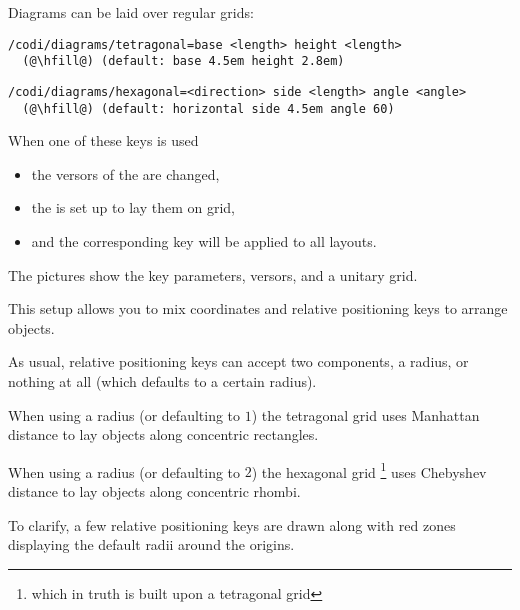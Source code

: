 \begin{marginfigure}[0cm]
\begin{subfigure}{\linewidth}
    \bigskip
  \end{subfigure}
\end{marginfigure}

Diagrams can be laid over regular grids:

\begin{lstlisting}
/codi/diagrams/tetragonal=base <length> height <length>
  (@\hfill@) (default: base 4.5em height 2.8em)
\end{lstlisting}

\begin{lstlisting}
/codi/diagrams/hexagonal=<direction> side <length> angle <angle>
  (@\hfill@) (default: horizontal side 4.5em angle 60)
\end{lstlisting}

When one of these keys is used
\begin{itemize}[noitemsep]
  \item the versors of the  are changed,
  \item the  is set up to lay them on grid,
  \item and the corresponding key will be applied to all layouts.
\end{itemize}

The pictures show the key parameters, versors, and a unitary grid.

This setup allows you to mix coordinates and
relative positioning keys to arrange objects.

As usual, relative positioning keys can accept two components, a radius,
or nothing at all (which defaults to a certain radius).

When using a radius (or defaulting to $1$)
the tetragonal grid uses Manhattan distance to
lay objects along concentric rectangles.

When using a radius (or defaulting to $2$)
the hexagonal grid%
\footnote{which in truth is built upon a tetragonal grid}
uses Chebyshev distance to
lay objects along concentric rhombi.

To clarify, a few relative positioning keys are drawn along
with red zones displaying the default radii around the origins.
